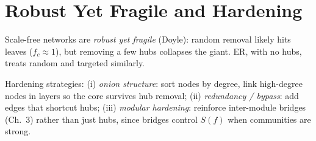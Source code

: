 \section{Robust Yet Fragile and Hardening}
\label{sec:hardening}
Scale-free networks are \emph{robust yet fragile} (Doyle): random removal likely hits leaves ($f_c\approx1$), but removing a few hubs collapses the giant. ER, with no hubs, treats random and targeted similarly.

Hardening strategies: (i) \emph{onion structure}: sort nodes by degree, link high-degree nodes in layers so the core survives hub removal; (ii) \emph{redundancy / bypass}: add edges that shortcut hubs; (iii) \emph{modular hardening}: reinforce inter-module bridges (Ch.~3) rather than just hubs, since bridges control $S(f)$ when communities are strong.

